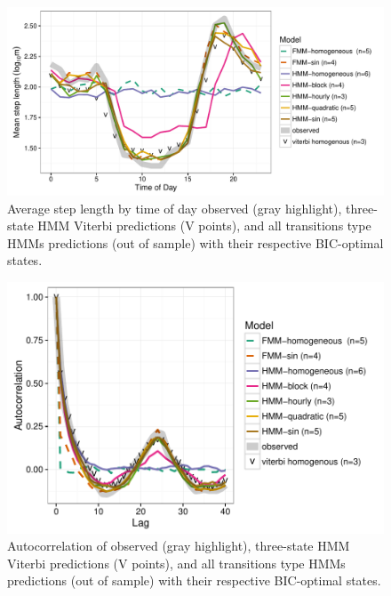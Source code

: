 \documentclass{bmcart}
\begin{document}
\begin{backmatter}
\begin{figure}[h!]
   \includegraphics[width=5in]{figure/avg_step_length_by_time-1}
  \caption{ Average step length by time of day observed (gray highlight), three-state HMM Viterbi predictions (V points), and all transitions type HMMs predictions (out of sample) with their respective BIC-optimal states.}
      \end{figure}
      
\begin{figure}[h!]
   \includegraphics[width=5in]{figure/acf_plot-1}
  \caption{ Autocorrelation of observed (gray highlight), three-state HMM Viterbi predictions (V points), and all transitions type HMMs predictions (out of sample) with their respective BIC-optimal states.}
      \end{figure}
      

\end{backmatter}
\end{document}

